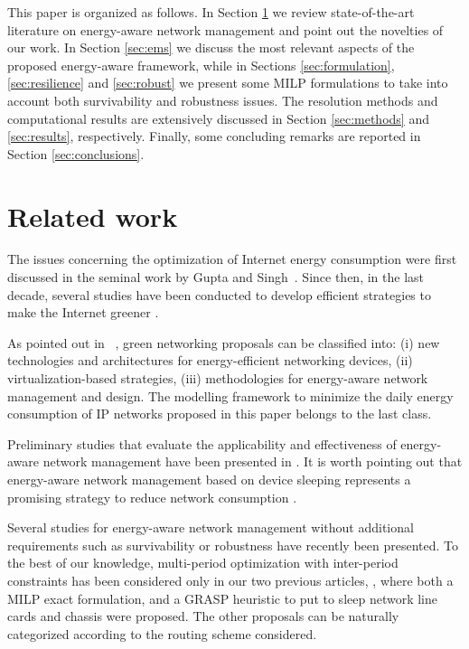 \documentclass[final,5p,times,twocolumn]{elsarticle}
\begin{document}
This paper is organized as follows. In Section \ref{sec:related} we review state-of-the-art literature on energy-aware network management and point out the novelties of our work. In Section \ref{sec:ems} we discuss the most relevant aspects of the proposed energy-aware framework, while in Sections \ref{sec:formulation}, \ref{sec:resilience} and \ref{sec:robust} we present some MILP formulations to take into account both survivability and robustness issues. The resolution methods and computational results are extensively discussed in Section \ref{sec:methods} and \ref{sec:results}, respectively. Finally, some concluding remarks are reported in Section \ref{sec:conclusions}.

\section{Related work}\label{sec:related}

The issues concerning the optimization of Internet energy consumption were first discussed in the seminal work by Gupta and Singh~\cite{gupta03}. Since then, in the last decade, several studies have been conducted to develop efficient strategies to make the Internet greener \cite{bianzino12c,bolla11,zeadally11}.

As pointed out in ~\cite{mellah09}, green networking proposals can be classified into: (i) new technologies and architectures for energy-efficient networking devices, (ii) virtualization-based strategies, (iii) methodologies for energy-aware network management and design. The modelling framework to minimize the daily energy consumption of IP networks proposed in this paper belongs to the last class.

Preliminary studies that evaluate the applicability and effectiveness of energy-aware network management have been  presented in \cite{bolla12,baldi09,restrepo09,bianzino10,bolla11b,chiaraviglio11b,chiaraviglio12a}. It is worth pointing out that  energy-aware network management based on device sleeping represents a promising strategy to reduce network consumption \cite{chiaraviglio11b}. 

Several studies for energy-aware network management without additional requirements such as survivability or robustness have recently been presented. To the best of our knowledge, multi-period optimization with inter-period constraints has been considered only in our  two previous articles, \cite{addis12a,addis13b}, where both a MILP exact formulation, and a GRASP heuristic to put to sleep network line cards and chassis were proposed. The other proposals can be naturally categorized according to the routing scheme considered.
\end{document}

